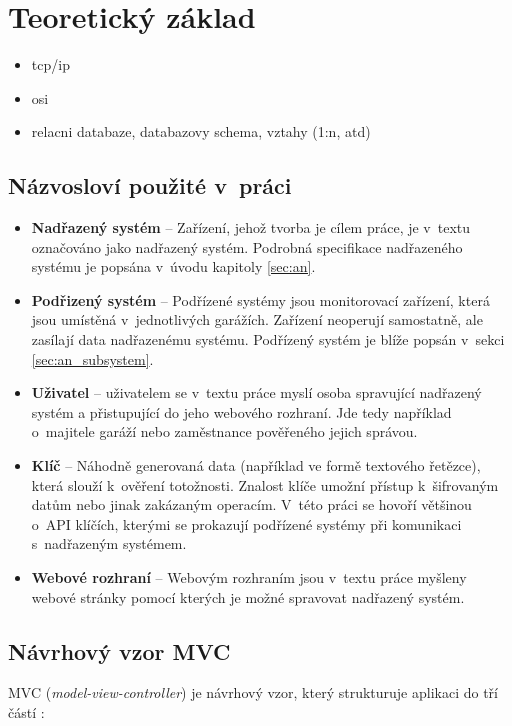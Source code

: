 \chapter{Teoretický základ}
\label{sec:te}
\begin{itemize}
    \item tcp/ip
    \item osi
    \item relacni databaze, databazovy schema, vztahy (1:n, atd)
\end{itemize}

\section{Názvosloví použité v~práci}

\begin{itemize}
    \item \textbf{Nadřazený systém} -- Zařízení, jehož tvorba je cílem práce, je v~textu označováno jako nadřazený systém. Podrobná specifikace nadřazeného systému je popsána v~úvodu kapitoly \ref{sec:an}.
    \item \textbf{Podřizený systém} -- Podřízené systémy jsou monitorovací zařízení, která jsou umístěná v~jednotlivých garážích. Zařízení neoperují samostatně, ale zasílají data nadřazenému systému. Podřízený systém je blíže popsán v~sekci \ref{sec:an_subsystem}.
    \item \textbf{Uživatel} -- uživatelem se v~textu práce myslí osoba spravující nadřazený systém a přistupující do jeho webového rozhraní. Jde tedy například o~majitele garáží nebo zaměstnance pověřeného jejich správou.
    \item \textbf{Klíč} -- Náhodně generovaná data (například ve formě textového řetězce), která slouží k~ověření totožnosti. Znalost klíče umožní přístup k~šifrovaným datům nebo jinak zakázaným operacím. V~této práci se hovoří většinou o~API klíčích, kterými se prokazují podřízené systémy při komunikaci s~nadřazeným systémem.
    \item \textbf{Webové rozhraní} -- Webovým rozhraním jsou v~textu práce myšleny webové stránky pomocí kterých je možné spravovat nadřazený systém.
\end{itemize}

\section{Návrhový vzor MVC}

MVC (\textit{model-view-controller}) je návrhový vzor, který strukturuje aplikaci do tří částí \cite{mvc_dalling}:

